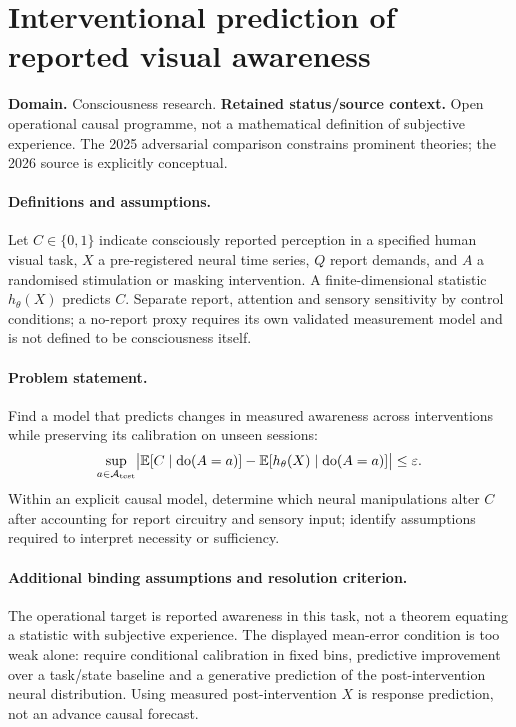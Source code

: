 \documentclass[11pt]{article}
\begin{document}
\section*{Interventional prediction of reported visual awareness}
\label{prob:103}
\label{rank:77}
\par\smallskip

\noindent\textbf{Domain.} Consciousness research. \quad \textbf{Retained status/source context.} Open operational causal programme, not a mathematical definition of subjective experience. The 2025 adversarial comparison constrains prominent theories; the 2026 source is explicitly conceptual.
\paragraph{Definitions and assumptions.} Let $C\in\{0,1\}$ indicate consciously reported perception in a specified human visual task, $X$ a pre-registered neural time series, $Q$ report demands, and $A$ a randomised stimulation or masking intervention. A finite-dimensional statistic $h_\theta(X)$ predicts $C$. Separate report, attention and sensory sensitivity by control conditions; a no-report proxy requires its own validated measurement model and is not defined to be consciousness itself.
\paragraph{Problem statement.} Find a model that predicts changes in measured awareness across interventions while preserving its calibration on unseen sessions:
\[
\sup_{a\in\mathcal A_{\rm test}}\bigl|\mathbb{E}[C\mid\operatorname{do}(A=a)]-\mathbb{E}[h_\theta(X)\mid\operatorname{do}(A=a)]\bigr|\leq\varepsilon.
\]
Within an explicit causal model, determine which neural manipulations alter $C$ after accounting for report circuitry and sensory input; identify assumptions required to interpret necessity or sufficiency.
\paragraph{Additional binding assumptions and resolution criterion.} The operational target is reported awareness in this task, not a theorem equating a statistic with subjective experience. The displayed mean-error condition is too weak alone: require conditional calibration in fixed bins, predictive improvement over a task/state baseline and a generative prediction of the post-intervention neural distribution. Using measured post-intervention $X$ is response prediction, not an advance causal forecast.
\end{document}
